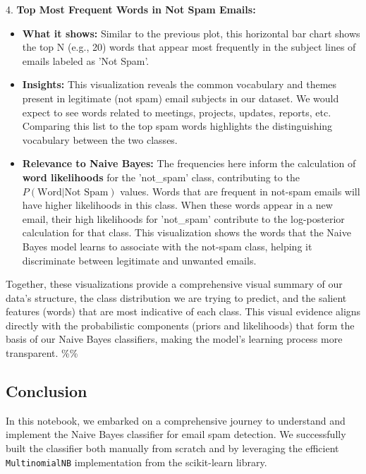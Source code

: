\documentclass[12pt,a4paper]{article}
\begin{document}
4.  \textbf{Top Most Frequent Words in Not Spam Emails:}
\begin{itemize}
    \item \textbf{What it shows:} Similar to the previous plot, this horizontal bar chart shows the top N (e.g., 20) words that appear most frequently in the subject lines of emails labeled as 'Not Spam'.
    \item \textbf{Insights:} This visualization reveals the common vocabulary and themes present in legitimate (not spam) email subjects in our dataset. We would expect to see words related to meetings, projects, updates, reports, etc. Comparing this list to the top spam words highlights the distinguishing vocabulary between the two classes.
    \item \textbf{Relevance to Naive Bayes:} The frequencies here inform the calculation of \textbf{word likelihoods} for the 'not\_spam' class, contributing to the $P(\text{Word} | \text{Not Spam})$ values. Words that are frequent in not-spam emails will have higher likelihoods in this class. When these words appear in a new email, their high likelihoods for 'not\_spam' contribute to the log-posterior calculation for that class. This visualization shows the words that the Naive Bayes model learns to associate with the not-spam class, helping it discriminate between legitimate and unwanted emails.
\end{itemize}

Together, these visualizations provide a comprehensive visual summary of our data's structure, the class distribution we are trying to predict, and the salient features (words) that are most indicative of each class. This visual evidence aligns directly with the probabilistic components (priors and likelihoods) that form the basis of our Naive Bayes classifiers, making the model's learning process more transparent.
\%\%


\subsection{Conclusion}

In this notebook, we embarked on a comprehensive journey to understand and implement the Naive Bayes classifier for email spam detection. We successfully built the classifier both manually from scratch and by leveraging the efficient \texttt{MultinomialNB} implementation from the scikit-learn library.
\end{document}
